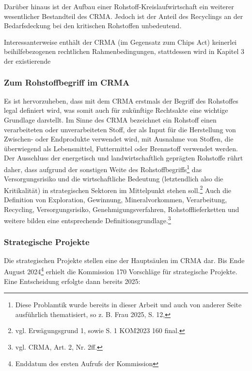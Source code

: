 \documentclass[12pt,a4paper,oneside]{book} %
\begin{document}
Darüber hinaus ist der Aufbau einer Rohstoff-Kreislaufwirtschaft ein weiterer wesentlicher Bestandteil des CRMA. Jedoch ist der Anteil des Recyclings an der Bedarfsdeckung bei den kritischen Rohstoffen unbedeutend.\autocite{Bericht zur Rohstoffsituation in Deutschland 2023}


Interessanterweise enthält der CRMA (im Gegensatz zum Chips Act) keinerlei beihilfebezogenen rechtlichen Rahmenbedingungen, stattdessen wird in Kapitel 3 der existierende 


\subsubsection{Zum Rohstoffbegriff im CRMA}
Es ist hervorzuheben, dass mit dem CRMA erstmals der Begriff des Rohstoffes legal definiert wird, was somit auch für zukünftige Rechtsakte eine wichtige Grundlage darstellt. Im Sinne des CRMA bezeichnet ein Rohstoff \glqq einen verarbeiteten oder unverarbeiteten Stoff, der als Input für die Herstellung von Zwischen- oder Endprodukte verwendet wird, mit Ausnahme von Stoffen, die überwiegend als Lebensmittel, Futtermittel oder Brennstoff verwendet werden\grqq. Der Ausschluss der energetisch und landwirtschaftlich geprägten Rohstoffe rührt daher, dass aufgrund der sonstigen Weite des Rohstoffbegriffs\footnote{Diese Problamtik wurde bereits in dieser Arbeit und auch von anderer Seite ausführlich thematisiert, so z. B. Frau 2025, S. 12, } das Versorgungsrisiko und die wirtschaftliche Bedeutung (letztendlich also die \glqq Kritikalität\grqq) in strategischen Sektoren im Mittelpunkt stehen soll.\footnote{vgl. Erwägungsgrund 1, sowie S. 1 KOM2023 160 final.}
Auch die Definition von Exploration, Gewinnung, Mineralvorkommen, Verarbeitung, Recycling, Versorgungsrisiko, Genehmigungsverfahren, Rohstofflieferketten und weitere bilden eine entsprechende Definitionsgrundlage.\footnote{vgl. CRMA, Art. 2, Nr. 2ff.}

\subsubsection{Strategische Projekte}
Die strategischen Projekte stellen eine der Hauptsäulen im CRMA dar. Bis Ende August 2024\footnote{Enddatum des ersten Aufrufs der Kommission} erhielt die Kommission 170 Vorschläge für strategische Projekte. Eine Entscheidung erfolgte dann bereits 2025:
\end{document}
